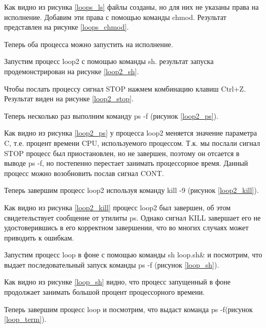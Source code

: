 Как видно из рисунка \ref{loops_ls} файлы созданы, но для них не указаны права на исполнение. Добавим эти права с помощью команды chmod. Результат представлен на рисунке \ref{loops_chmod}.


Теперь оба процесса можно запустить на исполнение.

Запустим процесс loop2 с помощью команды sh. результат запуска продемонстрирован на рисунке
\ref{loop2_sh}.

Чтобы послать процессу сигнал STOP нажмем комбинацию клавиш Ctrl+Z. Результат виден на рисунке \ref{loop2_stop}.


Теперь несколько раз выполним команду ps -f (рисунок \ref{loop2_ps}).


Как видно из рисунка \ref{loop2_ps} у процесса loop2 меняется значение параметра C, т.е. процент времени CPU, используемого процессом. Т.к. мы послали сигнал STOP процесс был приостановлен, но не завершен, поэтому он отсается в выводе ps -f, но постепенно перестает занимать процессорное время. Данный процесс можно возобновить послав сигнал CONT.

Теперь завершим процесс loop2 используя команду kill -9 (рисунок \ref{loop2_kill}).


Как видно из рисунка \ref{loop2_kill} процесс loop2 был завершен, об этом свидетельствует сообщение от утилиты ps. Однако сигнал KILL завершает его не удостоверившись в его корректном завершении, что во многих случаях может приводить к ошибкам.

Запустим процесс loop в фоне с помощью команды sh loop.sh\& и посмотрим, что выдает последовательный запуск команды ps -f (рисунок \ref{loop_sh}).


Как видно из рисунке \ref{loop_sh} видно, что процесс запущенный в фоне продолжает занимать большой процент процессорного времени.

Теперь завершим процесс loop и посмотрим, что выдаст команда ps -f(рисунок \ref{loop_term}).


